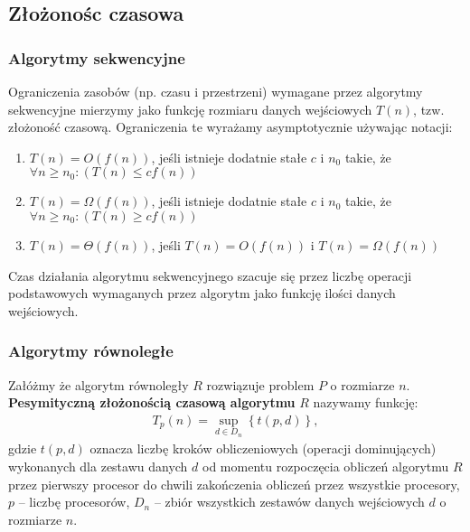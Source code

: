 \subsection{Złożonośc czasowa}
\label{subsec:algorytmy_sekwencyjne}
\subsubsection{Algorytmy sekwencyjne}

Ograniczenia zasobów (np. czasu i przestrzeni) wymagane przez algorytmy sekwencyjne mierzymy jako funkcję rozmiaru danych wejściowych \(T(n)\), tzw. złożoność czasową. Ograniczenia te wyrażamy asymptotycznie używając notacji:

\begin{enumerate}
\item{\(T(n) = O(f(n))\), jeśli istnieje dodatnie stałe \(c\) i \(n_0\) takie, że \(\forall{n \geq n_0}: (T(n)\leq cf(n)) \)}
\item{\(T(n) = \Omega(f(n))\), jeśli istnieje dodatnie stałe \(c\) i \(n_0\) takie, że \(\forall{n \geq n_0}: (T(n)\geq cf(n)) \)}
\item{\(T(n) = \Theta(f(n))\), jeśli \(T(n)=O(f(n))\) i \(T(n)=\Omega(f(n))\)}
\end{enumerate}
Czas działania algorytmu sekwencyjnego szacuje się przez liczbę operacji podstawowych wymaganych przez algorytm jako funkcję ilości danych wejściowych.
\subsubsection{Algorytmy równoległe}

\begin{definicja}\label{def:pesymistyczna_zlozonosc_czasowa}
Załóżmy że algorytm równoległy \(R\) rozwiązuje problem \(P\) o rozmiarze \(n\). \textbf{Pesymityczną złożonością czasową algorytmu} \(R\) nazywamy funkcję:\\
\begin{align}
T_{p}(n) = \sup_{d\in{D_n}}{\left\{t(p,d)\right\}},
\end{align}
gdzie \(t(p,d)\) oznacza liczbę kroków obliczeniowych (operacji dominujących) wykonanych dla zestawu danych \(d\) od momentu rozpoczęcia obliczeń algorytmu \(R\) przez pierwszy procesor do chwili zakończenia obliczeń przez wszystkie procesory, \(p\) -- liczbę procesorów, \(D_n\) -- zbiór wszystkich zestawów danych wejściowych \(d\) o rozmiarze \(n\).
\end{definicja}